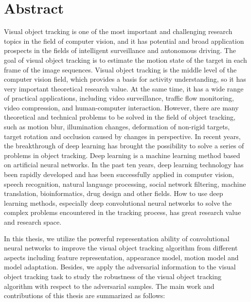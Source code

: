 
\intobmk\chapter*{Abstract}%

Visual object tracking is one of the most important and challenging research topics in the field of computer vision, and it has potential and broad application prospects in the fields of intelligent surveillance and autonomous driving. The goal of visual object tracking is to estimate the motion state of the target in each frame of the image sequences. Visual object tracking is the middle level of the computer vision field, which provides a basis for activity understanding, so it has very important theoretical research value. At the same time, it has a wide range of practical applications, including video surveillance, traffic flow monitoring, video compression, and human-computer interaction.
However, there are many theoretical and technical problems to be solved in the field of object tracking, such as motion blur, illumination changes, deformation of non-rigid targets, target rotation and occlusion caused by changes in perspective. In recent years, the breakthrough of deep learning has brought the possibility to solve a series of problems in object tracking.
Deep learning is a machine learning method based on artificial neural networks. In the past ten years, deep learning technology has been rapidly developed and has been successfully applied in computer vision, speech recognition, natural language processing, social network filtering, machine translation, bioinformatics, drug design and other fields. How to use deep learning methods, especially deep convolutional neural networks to solve the complex problems encountered in the tracking process, has great research value and research space.

In this thesis, we utilize the powerful representation ability of convolutional neural networks to improve the visual object tracking algorithm from different aspects including feature representation, appearance model, motion model and model adaptation. Besides, we apply the adversarial information to the visual object tracking task to study the robustness of the visual object tracking algorithm with respect to the adversarial samples. The main work and contributions of this thesis are summarized as follows:

